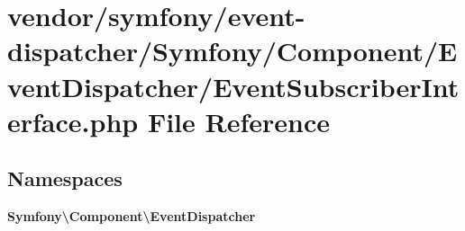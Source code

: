 \section{vendor/symfony/event-\/dispatcher/\+Symfony/\+Component/\+Event\+Dispatcher/\+Event\+Subscriber\+Interface.php File Reference}
\label{_event_subscriber_interface_8php}
\subsection*{Namespaces}
\begin{DoxyCompactItemize}
\item 
 {\bf Symfony\textbackslash{}\+Component\textbackslash{}\+Event\+Dispatcher}
\end{DoxyCompactItemize}

